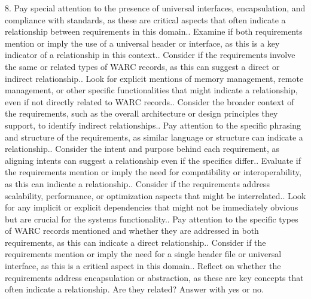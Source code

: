 8. Pay special attention to the presence of universal interfaces, encapsulation, and compliance with standards, as these are critical aspects that often indicate a relationship between requirements in this domain.. Examine if both requirements mention or imply the use of a universal header or interface, as this is a key indicator of a relationship in this context.. Consider if the requirements involve the same or related types of WARC records, as this can suggest a direct or indirect relationship.. Look for explicit mentions of memory management, remote management, or other specific functionalities that might indicate a relationship, even if not directly related to WARC records.. Consider the broader context of the requirements, such as the overall architecture or design principles they support, to identify indirect relationships.. Pay attention to the specific phrasing and structure of the requirements, as similar language or structure can indicate a relationship.. Consider the intent and purpose behind each requirement, as aligning intents can suggest a relationship even if the specifics differ.. Evaluate if the requirements mention or imply the need for compatibility or interoperability, as this can indicate a relationship.. Consider if the requirements address scalability, performance, or optimization aspects that might be interrelated.. Look for any implicit or explicit dependencies that might not be immediately obvious but are crucial for the system\textquotesingle{}s functionality.. Pay attention to the specific types of WARC records mentioned and whether they are addressed in both requirements, as this can indicate a direct relationship.. Consider if the requirements mention or imply the need for a single header file or universal interface, as this is a critical aspect in this domain.. Reflect on whether the requirements address encapsulation or abstraction, as these are key concepts that often indicate a relationship.\newline
\newline
Are they related?\newline
\newline
Answer with \textquotesingle{}yes\textquotesingle{} or \textquotesingle{}no\textquotesingle{}.